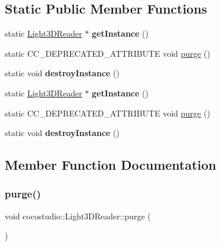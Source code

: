 \subsection*{Static Public Member Functions}
\begin{DoxyCompactItemize}
\item 
\mbox{\label{classcocostudio_1_1Light3DReader_a01ccb8d7f2faa76178a7005a670703cc}} 
static \hyperlink{classcocostudio_1_1Light3DReader}{Light3\+D\+Reader} $\ast$ {\bfseries get\+Instance} ()
\item 
static C\+C\+\_\+\+D\+E\+P\+R\+E\+C\+A\+T\+E\+D\+\_\+\+A\+T\+T\+R\+I\+B\+U\+TE void \hyperlink{classcocostudio_1_1Light3DReader_abf09ed3dd63c9ac19169a63456bf7903}{purge} ()
\item 
\mbox{\label{classcocostudio_1_1Light3DReader_addfee683891a0fa16c4e9a54d721b1fc}} 
static void {\bfseries destroy\+Instance} ()
\item 
\mbox{\label{classcocostudio_1_1Light3DReader_a78b5aed7dbfbb454ade93a68dac65e8b}} 
static \hyperlink{classcocostudio_1_1Light3DReader}{Light3\+D\+Reader} $\ast$ {\bfseries get\+Instance} ()
\item 
static C\+C\+\_\+\+D\+E\+P\+R\+E\+C\+A\+T\+E\+D\+\_\+\+A\+T\+T\+R\+I\+B\+U\+TE void \hyperlink{classcocostudio_1_1Light3DReader_a50ab165d90762336f8c7f5fd7427ff96}{purge} ()
\item 
\mbox{\label{classcocostudio_1_1Light3DReader_aea07649a0a61c854c9c8f4ac28215a4e}} 
static void {\bfseries destroy\+Instance} ()
\end{DoxyCompactItemize}


\subsection{Member Function Documentation}
\mbox{\label{classcocostudio_1_1Light3DReader_abf09ed3dd63c9ac19169a63456bf7903}} 
\subsubsection{\texorpdfstring{purge()}{purge()}\hspace{0.1cm}{\footnotesize\ttfamily [1/2]}}
{\footnotesize\ttfamily void cocostudio\+::\+Light3\+D\+Reader\+::purge (\begin{DoxyParamCaption}{ }\end{DoxyParamCaption})\hspace{0.3cm}{\ttfamily [static]}}

